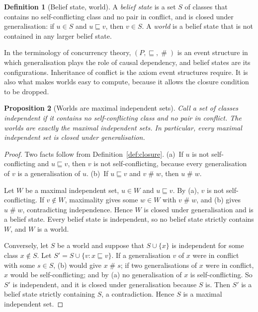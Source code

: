\documentclass[english]{desafiokunumi}
\newtheorem{proposition}{Proposition}
\theoremstyle{definition}
\newtheorem{definition}[proposition]{Definition}
\theoremstyle{remark}
\newcommand{\cf}{\mathrel{\#}}
\begin{document}
\begin{definition}[Belief state, world]
\label{def:world}
A \emph{belief state} is a set $S$ of classes that contains no self-conflicting
class and no pair in conflict, and is closed under generalisation: if $u \in S$
and $u \sqsubseteq v$, then $v \in S$. A \emph{world} is a belief state that is
not contained in any larger belief state.
\end{definition}

In the terminology of concurrency theory, $(P, \sqsubseteq, \cf)$ is an event
structure \citep{winskel1987event} in which generalisation plays the role of
causal dependency, and belief states are its configurations. Inheritance of
conflict is the axiom event structures require. It is also what makes worlds
easy to compute, because it allows the closure condition to be dropped.

\begin{proposition}[Worlds are maximal independent sets]
\label{prop:mundos}
Call a set of classes \emph{independent} if it contains no self-conflicting
class and no pair in conflict. The worlds are exactly the maximal independent
sets. In particular, every maximal independent set is closed under
generalisation.
\end{proposition}

\begin{proof}
Two facts follow from Definition~\ref{def:closure}. (a)~If $u$ is not
self-conflicting and $u \sqsubseteq v$, then $v$ is not self-conflicting,
because every generalisation of $v$ is a generalisation of $u$. (b)~If
$u \sqsubseteq v$ and $v \cf w$, then $u \cf w$.

Let $W$ be a maximal independent set, $u \in W$ and $u \sqsubseteq v$. By (a),
$v$ is not self-conflicting. If $v \notin W$, maximality gives some $w \in W$
with $v \cf w$, and (b) gives $u \cf w$, contradicting independence. Hence $W$
is closed under generalisation and is a belief state. Every belief state is
independent, so no belief state strictly contains $W$, and $W$ is a world.

Conversely, let $S$ be a world and suppose that $S \cup \{x\}$ is independent
for some class $x \notin S$. Let $S' = S \cup \{v : x \sqsubseteq v\}$. If a
generalisation $v$ of $x$ were in conflict with some $s \in S$, (b) would give
$x \cf s$; if two generalisations of $x$ were in conflict, $x$ would be
self-conflicting; and by (a) no generalisation of $x$ is self-conflicting. So
$S'$ is independent, and it is closed under generalisation because $S$ is. Then
$S'$ is a belief state strictly containing $S$, a contradiction. Hence $S$ is
a maximal independent set.
\end{proof}
\end{document}
